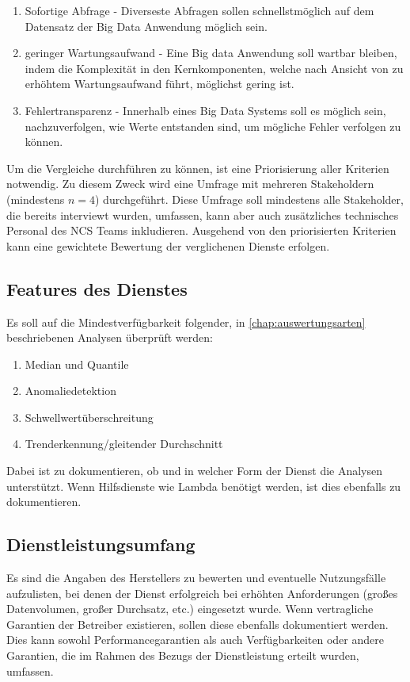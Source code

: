 \begin{enumerate}
\item Sofortige Abfrage  - 
Diverseste Abfragen sollen schnellstmöglich auf dem Datensatz der Big Data Anwendung möglich sein.

\item geringer Wartungsaufwand  - 
Eine Big data Anwendung soll wartbar bleiben, indem die Komplexität in den Kernkomponenten, welche nach Ansicht von \citeauthor{Marz.2015} zu erhöhtem Wartungsaufwand führt, möglichst gering ist.

\item Fehlertransparenz  - 
Innerhalb eines Big Data Systems soll es möglich sein, nachzuverfolgen, wie Werte entstanden sind, um mögliche Fehler verfolgen zu können.
\end{enumerate}

Um die Vergleiche durchführen zu können, ist eine Priorisierung aller Kriterien notwendig. Zu diesem Zweck wird eine Umfrage mit mehreren Stakeholdern (mindestens $n=4$) durchgeführt. Diese Umfrage soll mindestens alle Stakeholder, die bereits interviewt wurden, umfassen, kann aber auch zusätzliches technisches Personal des \ac{NCS} Teams inkludieren. Ausgehend von den priorisierten Kriterien kann eine gewichtete Bewertung der verglichenen Dienste erfolgen.


\subsection{Features des Dienstes}\label{subsection:Features}
Es soll auf die Mindestverfügbarkeit folgender, in \autoref{chap:auswertungsarten} beschriebenen Analysen überprüft werden:

\begin{enumerate}
\item Median und Quantile
\item Anomaliedetektion
\item Schwellwertüberschreitung
\item Trenderkennung/gleitender Durchschnitt
\end{enumerate}

Dabei ist zu dokumentieren, ob und in welcher Form der Dienst die Analysen unterstützt. Wenn Hilfsdienste wie Lambda benötigt werden, ist dies ebenfalls zu dokumentieren.

\subsection{Dienstleistungsumfang}\label{subsection:Dienstleistungsumfang}
Es sind die Angaben des Herstellers zu bewerten und eventuelle Nutzungsfälle aufzulisten, bei denen der Dienst erfolgreich bei erhöhten Anforderungen (großes Datenvolumen, großer Durchsatz, etc.) eingesetzt wurde. Wenn vertragliche Garantien der Betreiber existieren, sollen diese ebenfalls dokumentiert werden. Dies kann sowohl Performancegarantien als auch Verfügbarkeiten oder andere Garantien, die im Rahmen des Bezugs der Dienstleistung erteilt wurden, umfassen.

